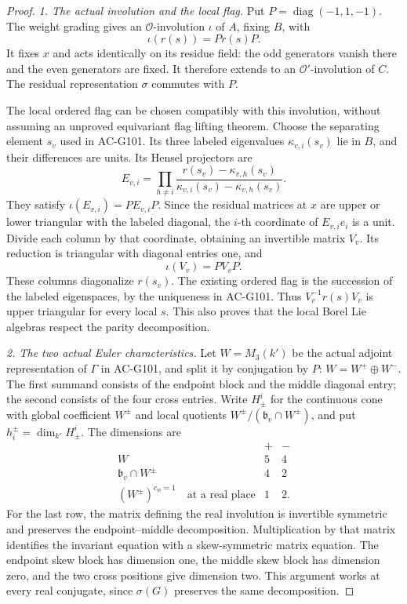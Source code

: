 \begin{proof}
\emph{1. The actual involution and the local flag.}
Put \(P=\operatorname{diag}(-1,1,-1)\).  The weight grading
gives an \(\mathcal O\)-involution \(\iota\) of \(A\),
fixing \(B\), with
\[
                       \iota(r(s))=P r(s)P.
 \tag{G105.4}
\]
It fixes \(x\) and acts identically on its residue field:
the odd generators vanish there and the even generators are
fixed.  It therefore extends to an \(\mathcal O'\)-involution
of \(C\).  The residual representation \(\sigma\) commutes
with \(P\).

The local ordered flag can be chosen compatibly with this
involution, without assuming an unproved equivariant flag
lifting theorem.  Choose the separating element \(s_v\) used
in AC-G101.  Its three labeled eigenvalues
\(\kappa_{v,i}(s_v)\) lie in \(B\), and their differences
are units.  Its Hensel projectors are
\[
 E_{v,i}=\prod_{h\ne i}
       \frac{r(s_v)-\kappa_{v,h}(s_v)}
            {\kappa_{v,i}(s_v)-\kappa_{v,h}(s_v)}.
 \tag{G105.5}
\]
They satisfy \(\iota(E_{v,i})=PE_{v,i}P\).  Since the
residual matrices at \(x\) are upper or lower triangular
with the labeled diagonal, the \(i\)-th coordinate of
\(E_{v,i}e_i\) is a unit.  Divide each column by that
coordinate, obtaining an invertible matrix \(V_v\).  Its
reduction is triangular with diagonal entries one, and
\[
                         \iota(V_v)=PV_vP.
 \tag{G105.6}
\]
These columns diagonalize \(r(s_v)\).  The existing ordered
flag is the succession of the labeled eigenspaces, by the
uniqueness in AC-G101.  Thus \(V_v^{-1}r(s)V_v\) is upper
triangular for every local \(s\).  This also proves that the
local Borel Lie algebras respect the parity decomposition.

\emph{2. The two actual Euler characteristics.}
Let \(W=M_3(k')\) be the actual adjoint representation of
\(\Gamma\) in AC-G101, and split it by conjugation by \(P\):
\(W=W^+\oplus W^-\).  The first summand consists of the
endpoint block and the middle diagonal entry; the second
consists of the four cross entries.  Write
\(H^i_\pm\) for the continuous cone with global coefficient
\(W^\pm\) and local quotients
\(W^\pm/(\mathfrak b_v\cap W^\pm)\), and put
\(h_i^\pm=\dim_{k'}H^i_\pm\).  The dimensions are
\[
\begin{array}{c|cc}
 &+&-\\ \hline
 W&5&4\\
 \mathfrak b_v\cap W^\pm&4&2\\
 (W^\pm)^{c_w=1}\quad\text{at a real place}&1&2.
\end{array}
 \tag{G105.7}
\]
For the last row, the matrix defining the real involution is
invertible symmetric and preserves the endpoint--middle
decomposition.  Multiplication by that matrix identifies
the invariant equation with a skew-symmetric matrix equation.
The endpoint skew block has dimension one, the middle skew
block has dimension zero, and the two cross positions give
dimension two.  This argument works at every real conjugate,
since \(\sigma(G)\) preserves the same decomposition.


\end{proof}
